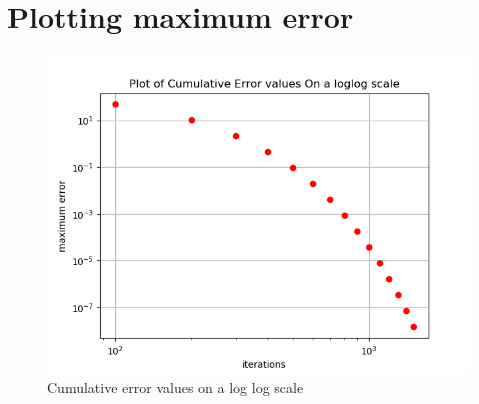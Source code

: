 \documentclass[11pt, a4paper]{article}
\begin{document}
\section{Plotting maximum error}
\begin{figure}[!tbh]
   	\centering
   	\includegraphics[scale=0.5]{fig5.png}  %
   	\caption{Cumulative error values on a log log scale}
   	\label{fig:sample}
   \end{figure} 
   
\end{document}
